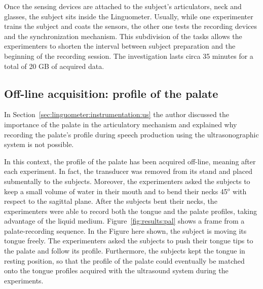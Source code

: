 Once the sensing devices are attached to the subject's articulators, neck and
glasses, the subject sits inside the Linguometer.
Usually, while one experimenter trains the subject and coats the sensors, the
other one tests the recording devices and the synchronization mechanism.
This subdivision of the tasks allows the experimenters to shorten the interval
between subject preparation and the beginning of the recording session.
The investigation lasts circa 35 minutes
for a total of 20 GB of acquired data.

\subsection{Off-line acquisition: profile of the palate}
\label{sec:experiments:palate}
In Section~\ref{sec:linguometer:instrumentation:us} 
%
%
the author discussed the
importance of the palate in the articulatory mechanism and 
explained why recording the palate's profile during speech production using 
the ultrasonographic system is not possible.

In this context, the profile of the palate has been acquired off-line, 
meaning after each experiment. 
In fact, the transducer was removed from its stand and placed submentally to the
subjects. 
Moreover, the experimenters asked the subjects to keep a small volume of water
in their mouth and to bend their necks 45$^o$ with respect to the sagittal
plane.
After the subjects bent their necks, the experimenters were able to record both
the tongue and the palate profiles, taking advantage of the liquid medium.
Figure~\ref{fig:results:pal} shows a frame from a palate-recording sequence.
In the Figure here shown, the subject is moving its tongue freely. 
The experimenters asked the subjects to push their tongue tips to the
palate and follow its profile.
Furthermore, the subjects kept the tongue in resting position, so that the
profile of the palate could eventually be matched onto the tongue profiles
acquired with the ultrasound system during the experiments.



